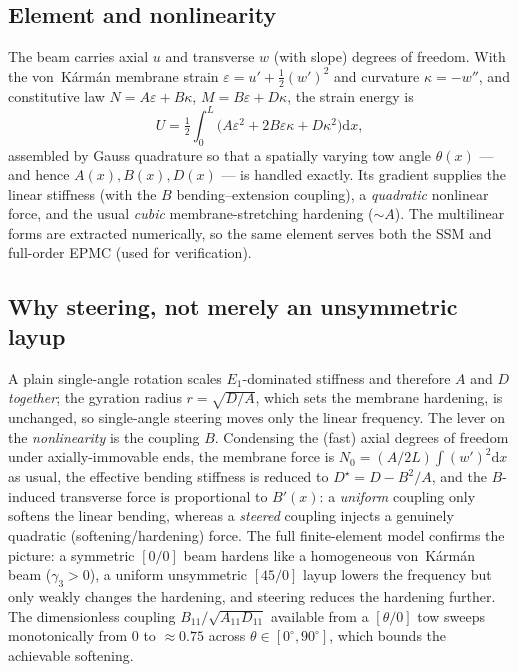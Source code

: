 \documentclass[11pt]{article}
\newcommand{\dd}{\mathrm{d}}
\begin{document}
\subsection{Element and nonlinearity}
The beam carries axial $u$ and transverse $w$ (with slope) degrees of freedom.
With the von~K\'arm\'an membrane strain $\varepsilon=u'+\tfrac12(w')^2$ and
curvature $\kappa=-w''$, and constitutive law $N=A\varepsilon+B\kappa$,
$M=B\varepsilon+D\kappa$, the strain energy is
\begin{equation}
U=\tfrac12\!\int_0^L\!\big(A\varepsilon^2+2B\varepsilon\kappa+D\kappa^2\big)\dd x,
\label{eq:energy}
\end{equation}
assembled by Gauss quadrature so that a spatially varying tow angle
$\theta(x)$ --- and hence $A(x),B(x),D(x)$ --- is handled exactly. Its gradient
supplies the linear stiffness (with the $B$ bending--extension coupling), a
\emph{quadratic} nonlinear force, and the usual \emph{cubic} membrane-stretching
hardening ($\sim A$). The multilinear forms are extracted numerically, so the
same element serves both the SSM and full-order EPMC (used for verification).

\subsection{Why steering, not merely an unsymmetric layup}
A plain single-angle rotation scales $E_1$-dominated stiffness and therefore
$A$ and $D$ \emph{together}; the gyration radius $r=\sqrt{D/A}$, which sets the
membrane hardening, is unchanged, so single-angle steering moves only the linear
frequency. The lever on the \emph{nonlinearity} is the coupling $B$. Condensing
the (fast) axial degrees of freedom under axially-immovable ends, the membrane
force is $N_0=(A/2L)\!\int(w')^2\dd x$ as usual, the effective bending stiffness
is reduced to $D^\star=D-B^2/A$, and the $B$-induced transverse force is
proportional to $B'(x)$: a \emph{uniform} coupling only softens the linear
bending, whereas a \emph{steered} coupling injects a genuinely quadratic
(softening/hardening) force. The full finite-element model confirms the picture:
a symmetric $[0/0]$ beam hardens like a homogeneous von~K\'arm\'an beam
($\gamma_3>0$), a uniform unsymmetric $[45/0]$ layup lowers the frequency but
only weakly changes the hardening, and steering reduces the hardening further.
The dimensionless coupling $B_{11}/\sqrt{A_{11}D_{11}}$ available from a
$[\theta/0]$ tow sweeps monotonically from $0$ to $\approx 0.75$ across
$\theta\in[0^\circ,90^\circ]$, which bounds the achievable softening.
\end{document}
